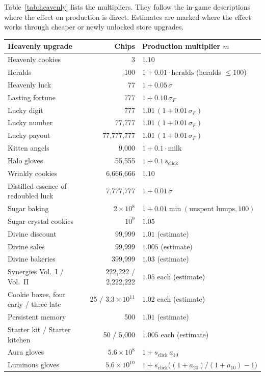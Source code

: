 \documentclass[11pt,a4paper]{article}
\numberwithin{equation}{section}
\theoremstyle{definition}
\theoremstyle{remark}
\begin{document}
Table~\ref{tab:heavenly} lists the multipliers. They follow the in-game descriptions where the effect on production is direct. Estimates are marked where the effect works through cheaper or newly unlocked store upgrades.

\begin{table}[t]
\centering
\small
\begin{tabular}{@{}lrl@{}}
\toprule
Heavenly upgrade & Chips & Production multiplier $m$ \\
\midrule
Heavenly cookies & 3 & $1.10$ \\
Heralds & 100 & $1+0.01\cdot\text{heralds}$ (heralds $\le100$) \\
Heavenly luck & 77 & $1+0.05\,\sigma$ \\
Lasting fortune & 777 & $1+0.10\,\sigma_F$ \\
Lucky digit & 777 & $1.01\,(1+0.01\,\sigma_F)$ \\
Lucky number & 77{,}777 & $1.01\,(1+0.01\,\sigma_F)$ \\
Lucky payout & 77{,}777{,}777 & $1.01\,(1+0.01\,\sigma_F)$ \\
Kitten angels & 9{,}000 & $1+0.1\cdot\text{milk}$ \\
Halo gloves & 55{,}555 & $1+0.1\,s_{\mathrm{click}}$ \\
Wrinkly cookies & 6{,}666{,}666 & $1.10$ \\
Distilled essence of redoubled luck & 7{,}777{,}777 & $1+0.01\,\sigma$ \\
Sugar baking & $2\times10^{8}$ & $1+0.01\min(\text{unspent lumps},100)$ \\
Sugar crystal cookies & $10^{9}$ & $1.05$ \\
Divine discount & 99{,}999 & $1.01$ (estimate) \\
Divine sales & 99{,}999 & $1.005$ (estimate) \\
Divine bakeries & 399{,}999 & $1.03$ (estimate) \\
Synergies Vol.~I / Vol.~II & 222{,}222 / 2{,}222{,}222 & $1.05$ each (estimate) \\
Cookie boxes, four early / three late & 25 / $3.3\times10^{11}$ & $1.02$ each (estimate) \\
Persistent memory & 500 & $1.01$ (estimate) \\
Starter kit / Starter kitchen & 50 / 5{,}000 & $1.005$ each (estimate) \\
Aura gloves & $5.6\times10^{8}$ & $1+s_{\mathrm{click}}\,a_{10}$ \\
Luminous gloves & $5.6\times10^{10}$ & $1+s_{\mathrm{click}}\bigl((1+a_{20})/(1+a_{10})-1\bigr)$ \\

\end{tabular}
\end{table}
\end{document}
